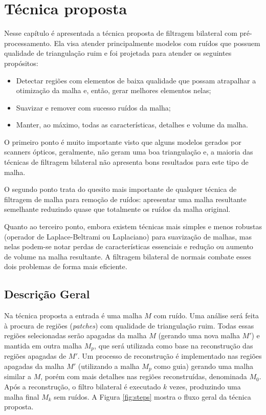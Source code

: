 \chapter{Técnica proposta}
\label{chap:tecnicaproposta}

Nesse capítulo é apresentada a técnica proposta de filtragem bilateral com pré-processamento. Ela visa atender principalmente modelos com ruídos que possuem qualidade de triangulação ruim e foi projetada para atender os seguintes propósitos:

\begin{itemize}  
\item Detectar regiões com elementos de baixa qualidade que possam atrapalhar a otimização da malha e, então, gerar melhores elementos nelas;
\item Suavizar e remover com sucesso ruídos da malha;
\item Manter, ao máximo, todas as características, detalhes e volume da malha.
\end{itemize}

O primeiro ponto é muito importante visto que alguns modelos gerados por scanners ópticos, geralmente, não geram uma boa triangulação e, a maioria das técnicas de filtragem bilateral não apresenta bons resultados para este tipo de malha.

O segundo ponto trata do quesito mais importante de qualquer técnica de filtragem de malha para remoção de ruídos: apresentar uma malha resultante semelhante reduzindo quase que totalmente os ruídos da malha original.

Quanto ao terceiro ponto, embora existem técnicas mais simples e menos robustas (operador de Laplace-Beltrami ou Laplaciano) para suavização de malhas, mas nelas podem-se notar perdas de características essenciais e redução ou aumento de volume na malha resultante. A filtragem bilateral de normais combate esses dois problemas de forma mais eficiente.

\section{Descrição Geral}

Na técnica proposta a entrada é uma malha $M$ com ruído. Uma análise será feita à procura de regiões (\textit{patches}) com qualidade de triangulação ruim. Todas essas regiões selecionadas serão apagadas da malha $M$ (gerando uma nova malha $M'$) e mantida em outra malha $M_p$, que será utilizada como base na reconstrução das regiões apagadas de $M'$. Um processo de reconstrução é implementado nas regiões apagadas da malha $M'$ (utilizando a malha $M_p$ como guia) gerando uma malha similar a $M$, porém com mais detalhes nas regiões reconstruídas, denominada $M_0$. Após a reconstrução, o filtro bilateral é executado $k$ vezes, produzindo uma malha final $M_k$ sem ruídos. A Figura \ref{fig:steps} mostra o fluxo geral da técnica proposta.

